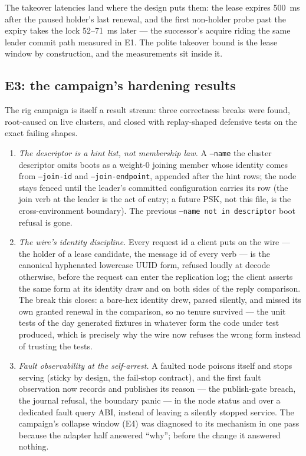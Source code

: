 \documentclass[10pt,journal,letterpaper]{IEEEtran}
\newcommand{\code}[1]{\texttt{\small #1}}
\begin{document}
The takeover latencies land where the design puts them: the lease
expires 500~ms after the paused holder's last renewal, and the first
non-holder probe past the expiry takes the lock 52--71~ms later --- the
successor's acquire riding the same leader commit path measured in E1.
The polite takeover bound is the lease window by construction, and the
measurements sit inside it.

\subsection{E3: the campaign's hardening results}

The rig campaign is itself a result stream: three correctness breaks
were found, root-caused on live clusters, and closed with
replay-shaped defensive tests on the exact failing shapes.

\begin{enumerate}
\item \emph{The descriptor is a hint list, not membership law.} A
\code{--name} the cluster descriptor omits boots as a weight-0 joining
member whose identity comes from \code{--join-id} and
\code{--join-endpoint}, appended after the hint rows; the node stays
fenced until the leader's committed configuration carries its row (the
join verb at the leader is the act of entry; a future PSK, not this
file, is the cross-environment boundary). The previous
\code{--name not in descriptor} boot refusal is gone.
\item \emph{The wire's identity discipline.} Every request id a client
puts on the wire --- the holder of a lease candidate, the message id of
every verb --- is the canonical hyphenated lowercase UUID form,
refused loudly at decode otherwise, before the request can enter the
replication log; the client asserts the same form at its identity draw
and on both sides of the reply comparison. The break this closes: a
bare-hex identity drew, parsed silently, and missed its own granted
renewal in the comparison, so no tenure survived --- the unit tests of
the day generated fixtures in whatever form the code under test
produced, which is precisely why the wire now refuses the wrong form
instead of trusting the tests.
\item \emph{Fault observability at the self-arrest.} A faulted node
poisons itself and stops serving (sticky by design, the fail-stop
contract), and the first fault observation now records and publishes
its reason --- the publish-gate breach, the journal refusal, the
boundary panic --- in the node status and over a dedicated fault
query ABI, instead of leaving a silently stopped service. The
campaign's collapse window (E4) was diagnosed to its mechanism in one
pass because the adapter half answered ``why''; before the change it
answered nothing.
\end{enumerate}
\end{document}
